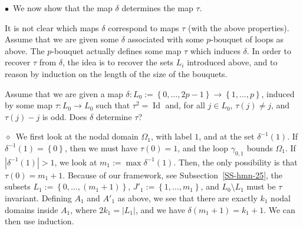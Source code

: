 \documentclass[12pt,a4paper]{amsart}
\theoremstyle{plain} %
\theoremstyle{definition}
\numberwithin{equation}{section}
\numberwithin{figure}{section}
\numberwithin{table}{section}
\DeclareMathOperator{\id}{Id}
\newcommand{\sm}{\!\setminus\!}
\newcommand{\set}[1]{\left\lbrace #1 \right\rbrace}
\newcommand{\noib}{\noindent $\bullet$~}
\newcommand{\noid}{\noindent $\diamond$~}
\begin{document}
\noib We now show that the map $\delta$ determines the map $\tau$.\smallskip

It is not clear which maps $\delta$ correspond to maps $\tau$ (with the above properties). Assume that we are given some $\delta$ associated with some $p$-bouquet of loops as above. The $p$-bouquet actually defines some map $\tau$ which induces $\delta$. In order to recover $\tau$ from $\delta$, the idea is to recover the sets $L_i$ introduced above, and to reason by induction on the length of the size of the bouquets.\smallskip

Assume that we are given a map $\delta : L_0  := \set{0,\ldots,2p-1} \to \set{1,\ldots,p}$, induced by some map $\tau : L_0 \to L_0$ such that $\tau^2 = \id$ and, for all $j \in L_0$, $\tau(j) \not = j$, and $\tau(j)-j$ is odd. Does $\delta$ determine $\tau$?\smallskip

\noid We first look at the nodal domain $\Omega_1$, with label $1$, and at the set $\delta^{-1}(1)$. If $\delta^{-1}(1) = \set{0}$, then we must have $\tau(0)=1$, and the loop $\gamma_{0,1}$ bounds $\Omega_1$. If $|\delta^{-1}(1)| > 1$, we look at $m_1 := \max \delta^{-1}(1)$. Then, the only possibility is that $\tau(0) = m_1+1$. Because of our framework, see Subsection~\ref{SS-hmn-25}, the subsets $L_1 := \set{0,\ldots, (m_1+1)}$, $J'_1:=\set{1,\ldots,m_1}$, and $L_0\sm L_1$ must be $\tau$ invariant. Defining $A_1$ and $A'_1$ as above, we see that there are exactly $k_1$ nodal domains inside $A_1$, where $2k_1 = |L_1|$, and we have $\delta(m_1+1) = k_1+1$. We can then use induction.

\vspace{1cm}

\newpage


%


\end{document}
